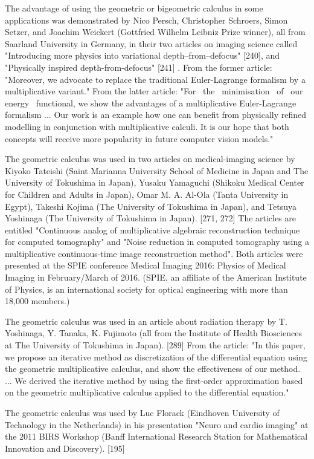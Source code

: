 \documentclass[12pt]{article}
\begin{document}
The advantage of using the geometric or bigeometric calculus in some applications was demonstrated by Nico Persch, Christopher Schroers, Simon Setzer, and Joachim Weickert (Gottfried Wilhelm Leibniz Prize winner), all from Saarland University in Germany, in their two articles on imaging science called "Introducing more physics into variational depth–from–defocus" [240], and "Physically inspired depth-from-defocus" [241] . From the former article: "Moreover, we advocate to replace the traditional Euler-Lagrange formalism by a multiplicative variant." From the latter article: "For  the  minimisation  of  our  energy  functional, we show the advantages of a multiplicative Euler-Lagrange formalism ... Our work is an example how one can benefit from physically refined modelling in conjunction with multiplicative calculi. It is our hope that both concepts will receive more popularity in future computer vision models."

The geometric calculus was used in two articles on medical-imaging science by Kiyoko Tateishi (Saint Marianna University School of Medicine in Japan and The University of Tokushima in Japan), Yusaku Yamaguchi (Shikoku Medical Center for Children and Adults in Japan), Omar M. A. Al-Ola (Tanta University in Egypt), Takeshi Kojima (The University of Tokushima in Japan), and Tetsuya Yoshinaga (The University of Tokushima in Japan). [271, 272] The articles are entitled "Continuous analog of multiplicative algebraic reconstruction technique for computed tomography" and "Noise reduction in computed tomography using a multiplicative continuous-time image reconstruction method". Both articles were presented at the SPIE conference Medical Imaging 2016: Physics of Medical Imaging in February/March of 2016. (SPIE, an affiliate of the American Institute of Physics, is an international society for optical engineering with more than 18,000 members.)

The geometric calculus was used in an article about radiation therapy by T. Yoshinaga, Y. Tanaka, K. Fujimoto (all from the Institute of Health Biosciences at The University of Tokushima in Japan). [289] From the article: "In this paper, we propose an iterative method as discretization of the differential equation using the geometric multiplicative calculus, and show the effectiveness of our method. ... We derived the iterative method by using the first-order approximation based on the geometric multiplicative calculus applied to the differential equation."

The geometric calculus was used by Luc Florack (Eindhoven University of Technology in the Netherlands) in his presentation "Neuro and cardio imaging" at the 2011 BIRS Workshop (Banff International Research Station for Mathematical Innovation and Discovery). [195]
\end{document}
